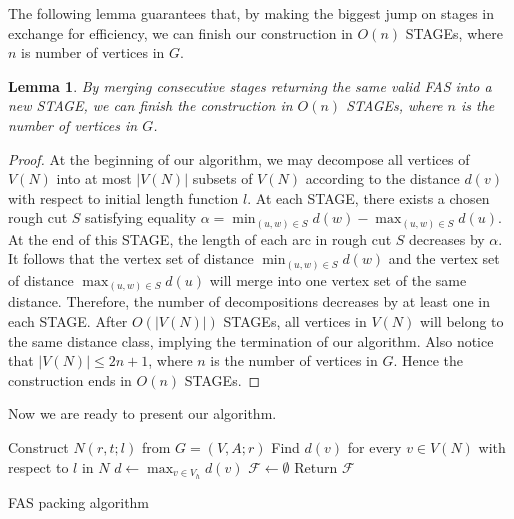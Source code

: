 \documentclass[11pt]{article}
\newtheorem{lemma}[theorem]{Lemma}
\begin{document}
The following lemma guarantees that, by making the biggest jump on stages in exchange for efficiency, we can finish our construction in $O(n)$ STAGEs, where $n$ is number of vertices in $G$.

\begin{lemma}
\label{lem:5}
By merging consecutive stages returning the same valid FAS into a new STAGE, we can finish the construction in $O(n)$ STAGEs, where $n$ is the number of vertices in $G$.
\end{lemma}
\begin{proof}
At the beginning of our algorithm, we may decompose all vertices of $V(N)$ into at most $\lvert V(N)\rvert$ subsets of $V(N)$ according to the distance $d(v)$ with respect to initial length function $l$. At each STAGE, there exists a chosen rough cut $S$ satisfying equality $\alpha=\min_{(u,w)\in S} d(w)-\max_{(u,w)\in S} d(u)$. At the end of this STAGE, the length of each arc in rough cut $S$ decreases by $\alpha$. It follows that the vertex set of distance $\min_{(u,w)\in S} d(w)$ and the vertex set of distance $\max_{(u,w)\in S} d(u)$ will merge into one vertex set of the same distance. Therefore, the number of decompositions decreases by at least one in each STAGE. After $O(\lvert V(N)\rvert)$ STAGEs, all vertices in $V(N)$ will belong to the same distance class, implying the termination of our algorithm. Also notice that $\lvert V(N)\rvert\leq 2n+1$, where $n$ is the number of vertices in $G$. Hence the construction ends in $O(n)$ STAGEs.
\end{proof}
Now we are ready to present our algorithm. 
\SetAlFnt{\small}
\begin{algorithm}[!ht]
  \SetAlgoLined
  \SetAlgoNoEnd
  \BlankLine
  Construct $N(r,t;l)$ from $G=(V,A;r)$\;
  Find $d(v)$ for every $v\in V(N)$ with respect to $l$ in $N$\; %
  $d\leftarrow \max_{v\in V_h}d(v)$\;
  $\mathcal{F}\leftarrow \emptyset$\;
  Return $\mathcal{F}$\;
  \BlankLine
  \caption{FAS packing algorithm}
\end{algorithm} 
\end{document}
